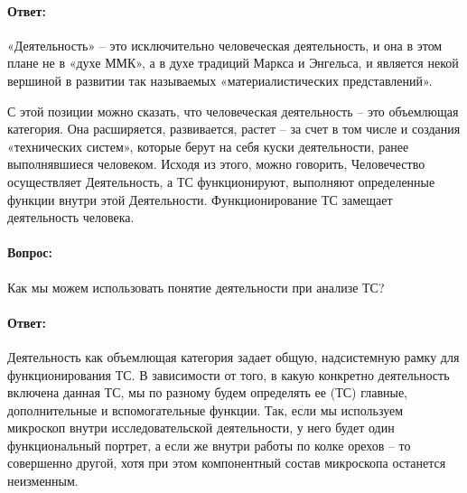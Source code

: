 \documentclass[11pt,a4paper]{article}
\begin{document}
\paragraph{Ответ:}
«Деятельность» – это исключительно человеческая деятельность, и она в этом
плане не в «духе ММК», а в духе традиций Маркса и Энгельса, и является некой
вершиной в развитии так называемых «материалистических представлений».

С этой позиции можно сказать, что человеческая деятельность -- это объемлющая
категория. Она расширяется, развивается, растет – за счет в том числе и
создания «технических систем», которые берут на себя куски деятельности, ранее
выполнявшиеся человеком. Исходя из этого, можно говорить, Человечество
осуществляет Деятельность, а ТС функционируют, выполняют определенные функции
внутри этой Деятельности.  Функционирование ТС замещает деятельность человека.

\paragraph{Вопрос:}
Как мы можем использовать понятие деятельности при анализе ТС?

\paragraph{Ответ:}
Деятельность как объемлющая категория задает общую, надсистемную рамку для
функционирования ТС. В зависимости от того, в какую конкретно деятельность
включена данная ТС, мы по разному будем определять ее (ТС) главные,
дополнительные и вспомогательные функции. Так, если мы используем микроскоп
внутри исследовательской деятельности, у него будет один функциональный
портрет, а если же внутри работы по колке орехов – то совершенно другой, хотя
при этом компонентный состав микроскопа останется неизменным.
\end{document}
